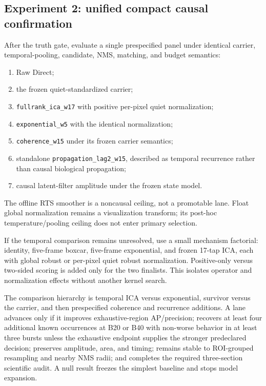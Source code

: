 \subsection{Experiment 2: unified compact causal confirmation}

After the truth gate, evaluate a single prespecified panel under identical
carrier, temporal-pooling, candidate, NMS, matching, and budget semantics:

\begin{enumerate}
  \item Raw Direct;
  \item the frozen quiet-standardized carrier;
  \item \texttt{fullrank\_ica\_w17} with positive per-pixel quiet
        normalization;
  \item \texttt{exponential\_w5} with the identical normalization;
  \item \texttt{coherence\_w15} under its frozen carrier semantics;
  \item standalone \texttt{propagation\_lag2\_w15}, described as temporal
        recurrence rather than causal biological propagation;
  \item causal latent-filter amplitude under the frozen state model.
\end{enumerate}

The offline RTS smoother is a noncausal ceiling, not a promotable lane. Float
global normalization remains a visualization transform; its post-hoc
temperature/pooling ceiling does not enter primary selection.

If the temporal comparison remains unresolved, use a small mechanism
factorial: identity, five-frame boxcar, five-frame exponential, and frozen
17-tap ICA, each with global robust or per-pixel quiet robust normalization.
Positive-only versus two-sided scoring is added only for the two finalists.
This isolates operator and normalization effects without another kernel search.

The comparison hierarchy is temporal ICA versus exponential, survivor versus
the carrier, and then prespecified coherence and recurrence additions. A lane
advances only if it improves exhaustive-region AP/precision; recovers at least
four additional known occurrences at B20 or B40 with non-worse behavior in at
least three bursts unless the exhaustive endpoint supplies the stronger
predeclared decision; preserves amplitude, area, and timing; remains stable to
ROI-grouped resampling and nearby NMS radii; and completes the required
three-section scientific audit. A null result freezes the simplest baseline
and stops model expansion.

